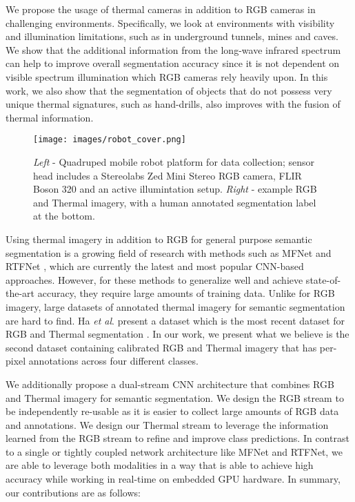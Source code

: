 \documentclass[letterpaper, 10 pt, conference]{ieeeconf}
\newcommand{\etal}{\textit{et al}. }
\begin{document}
We propose the usage of thermal cameras in addition to RGB cameras in challenging environments. Specifically, we look at environments with visibility and illumination limitations, such as in underground tunnels, mines and caves. We show that the additional information from the long-wave infrared spectrum can help to improve overall segmentation accuracy since it is not dependent on visible spectrum illumination which RGB cameras rely heavily upon. In this work, we also show that the segmentation of objects that do not possess very unique thermal signatures, such as hand-drills, also improves with the fusion of thermal information.

\begin{figure}[t]
\begin{center}
\texttt{[image: images/robot\_cover.png]}
\end{center}
   \caption{\textit{Left} - Quadruped mobile robot platform for data collection; sensor head includes a Stereolabs Zed Mini Stereo RGB camera, FLIR Boson 320 and an active illumintation setup. \textit{Right} - example RGB and Thermal imagery, with a human annotated segmentation label at the bottom.}
\label{fig:robot_data}
\end{figure}

Using thermal imagery in addition to RGB for general purpose semantic segmentation is a growing field of research with methods such as MFNet \cite{ha2017mfnet} and RTFNet \cite{sun2019rtfnet}, which are currently the latest and most popular CNN-based approaches. However, for these methods to generalize well and achieve state-of-the-art accuracy, they require large amounts of training data. Unlike for RGB imagery, large datasets of annotated thermal imagery for semantic segmentation are hard to find. Ha \etal present a dataset which is the most recent dataset for RGB and Thermal segmentation \cite{ha2017mfnet}. In our work, we present what we believe is the second dataset containing calibrated RGB and Thermal imagery that has per-pixel annotations across four different classes. 

We additionally propose a dual-stream CNN architecture that combines RGB and Thermal imagery for semantic segmentation. We design the RGB stream to be independently re-usable as it is easier to collect large amounts of RGB data and annotations. We design our Thermal stream to leverage the information learned from the RGB stream to refine and improve class predictions. In contrast to a single or tightly coupled network architecture like MFNet and RTFNet, we are able to leverage both modalities in a way that is able to achieve high accuracy while working in real-time on embedded GPU hardware. In summary, our contributions are as follows:
\end{document}
